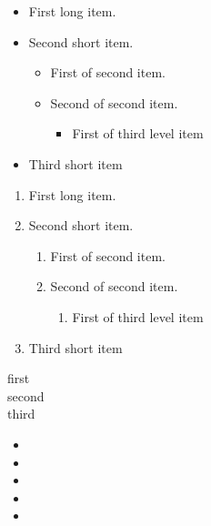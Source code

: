 \documentclass{enisareport}
\theoremstyle{plain}
\theoremstyle{definition}
\begin{document}
\begin{itemize}
\item First long item.
  \lipsum[3][1-3]
  \item Second short item.
    \begin{itemize}
      \item First of second item.
      \item Second of second item.
        \begin{itemize}
        \item First of third level item
          \end{itemize}
    \end{itemize}
\item Third short item
\end{itemize}

\lipsum[1][3-7]

\begin{enumerate}
\item First long item.
  \lipsum[4][1-4]
  \item Second short item.
    \begin{enumerate}
      \item First of second item.
      \item Second of second item.
        \begin{enumerate}
        \item First of third level item
          \end{enumerate}
    \end{enumerate}
\item Third short item
\end{enumerate}

\lipsum[1][3]

\begin{description}
\item[first]  \lipsum[4][2]
\item[second] \lipsum[4][3]
\item[third]  \lipsum[4][4-5]

\end{description}



\begin{itemize}[label=\textcolor{enisa_orange}{\large\bfseries Q}]
\item \lipsum[3][1-2]
\item \lipsum[4][1-2]
\item \lipsum[5][1-2]
\item \lipsum[6][1-2]
\item \lipsum[7][1-2]
\end{itemize}
\end{document}
